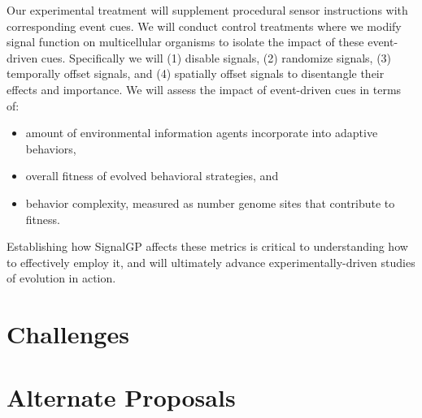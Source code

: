 Our experimental treatment will supplement procedural sensor instructions with corresponding event cues.
We will conduct control treatments where we modify signal function on multicellular organisms to isolate the impact of these event-driven cues.  Specifically we will (1) disable signals, (2) randomize signals, (3) temporally offset signals, and (4) spatially offset signals to disentangle their effects and importance.
We will assess the impact of event-driven cues in terms of:
\begin{itemize}
\item amount of environmental information agents incorporate into adaptive behaviors,
\item overall fitness of evolved behavioral strategies, and
\item behavior complexity, measured as number genome sites that contribute to fitness.
\end{itemize}

Establishing how SignalGP affects these metrics is critical to understanding how to effectively employ it, and will ultimately advance experimentally-driven studies of evolution in action.

\section{Challenges}






\section{Alternate Proposals}

